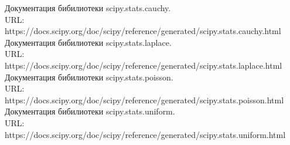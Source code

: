 \documentclass{article}
\begin{document}
\newpage
\begin{thebibliography}{4}
Документация бибилиотеки scipy.stats.cauchy. 
\\ URL: https://docs.scipy.org/doc/scipy/reference/generated/scipy.stats.cauchy.html
Документация бибилиотеки scipy.stats.laplace. 
\\ URL: https://docs.scipy.org/doc/scipy/reference/generated/scipy.stats.laplace.html
Документация бибилиотеки scipy.stats.poisson.
\\ URL: https://docs.scipy.org/doc/scipy/reference/generated/scipy.stats.poisson.html
Документация бибилиотеки scipy.stats.uniform.
\\ URL: https://docs.scipy.org/doc/scipy/reference/generated/scipy.stats.uniform.html
\end{thebibliography}
\end{document}
